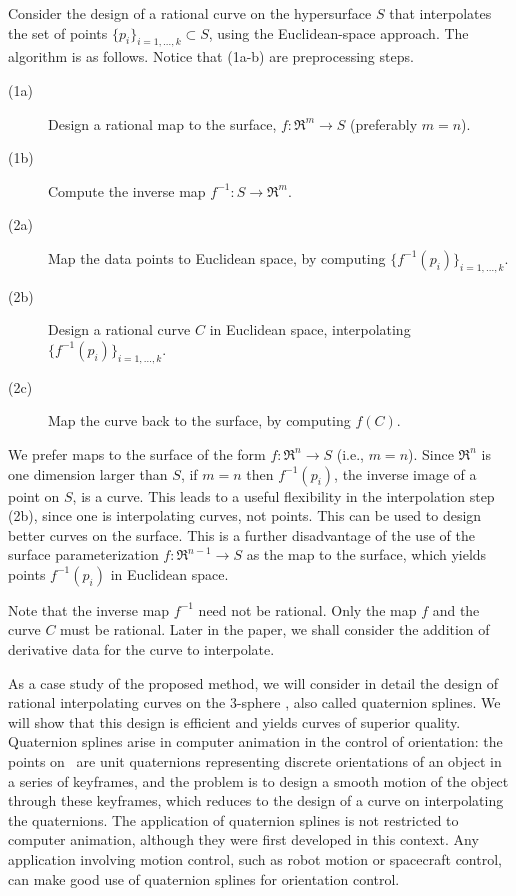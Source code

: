Consider the design of a rational
curve on the hypersurface $S$ that interpolates the set of points 
$\{p_i\}_{i=1,\ldots,k} \subset S$, using the Euclidean-space approach.
The algorithm is as follows. 
Notice that (1a-b) are preprocessing steps.
%
\begin{description}
\item[(1a)] Design a rational map to the surface, $f:\Re^m \rightarrow S$ (preferably $m=n$).
\item[(1b)] Compute the inverse map $f^{-1}:S \rightarrow \Re^m$.
\item[(2a)] Map the data points to Euclidean space, by computing $\{f^{-1}(p_i)\}_{i=1,\ldots,k}$.
\item[(2b)] Design a rational curve $C$ in Euclidean space, interpolating $\{f^{-1}(p_i)\}_{i=1,\ldots,k}$.
\item[(2c)] Map the curve back to the surface, by computing $f(C)$.
\end{description}

We prefer maps to the surface of the form $f:\Re^n \rightarrow S$ (i.e., $m=n$).
Since $\Re^n$ is one dimension larger than $S$,
if $m=n$ then $f^{-1}(p_i)$, the inverse image of a point on $S$, is a curve.
This leads to a useful flexibility in the interpolation step (2b),
since one is interpolating curves, not points.
This can be used to design better curves on the surface.
This is a further disadvantage of the use of the surface
parameterization $f:\Re^{n-1} \rightarrow S$ as the map to the surface,
which yields points $f^{-1}(p_i)$ in Euclidean space.

Note that the inverse map $f^{-1}$ need not be rational.
Only the map $f$ and the curve $C$ must be rational.
Later in the paper, we shall consider the addition of derivative data
for the curve to interpolate.

As a case study of the proposed method,
we will consider in detail the design of rational interpolating curves 
on the 3-sphere , also called quaternion splines.
We will show that this design is efficient and yields curves of superior
quality.
Quaternion splines arise in computer animation in the control of
orientation: the points on \ are unit quaternions representing
discrete orientations of an object in a series of keyframes,
and the problem is to design a smooth motion of the object through
these keyframes,
which reduces to the design of a curve on 
interpolating the quaternions.
The application of quaternion 
splines is not restricted to computer animation, although they were
first developed in this context.  
Any application involving motion control,
such as robot motion or spacecraft control, 
can make good use of quaternion splines for orientation control.

